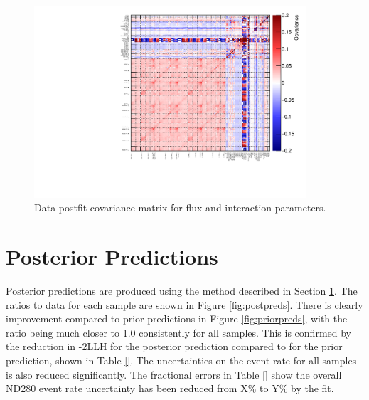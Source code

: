 \begin{figure}
\centering
\includegraphics*[width=0.9\textwidth,clip]{figs/datpostfitcov}
\caption{Data postfit covariance matrix for flux and interaction parameters.}\label{fig:datpostfitcov}
\end{figure}

\section{Posterior Predictions}\label{sec:postpred}

Posterior predictions are produced using the method described in Section \ref{sec:postpred}. The ratios to data for each sample are shown in Figure \ref{fig:postpreds}. There is clearly improvement compared to prior predictions in Figure \ref{fig:priorpreds}, with the ratio being much closer to 1.0 consistently for all samples. This is confirmed by the reduction in -2LLH for the posterior prediction compared to for the prior prediction, shown in Table \ref{}. The uncertainties on the event rate for all samples is also reduced significantly. The fractional errors in Table \ref{} show the overall ND280 event rate uncertainty has been reduced from X$\%$ to Y$\%$ by the fit.

